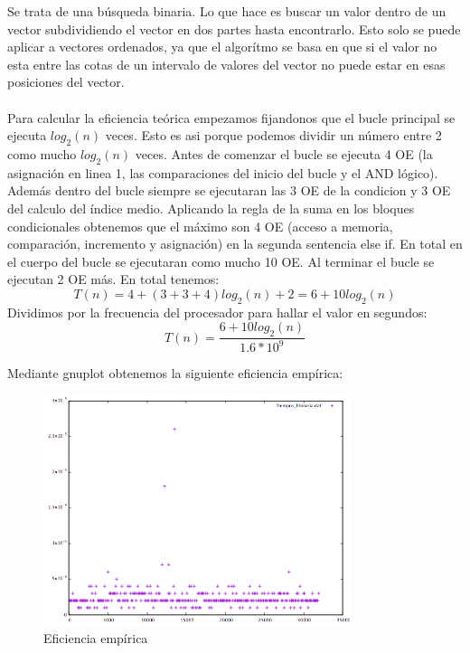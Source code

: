 \documentclass{article}
\begin{document}
	Se trata de una b\'usqueda binaria. Lo que hace es buscar un valor dentro de un vector subdividiendo el vector en dos partes hasta encontrarlo. Esto solo se puede aplicar a vectores ordenados, ya que el algor\'itmo se basa en que si el valor no esta entre las cotas de un intervalo de valores del vector no puede estar en esas posiciones del vector. \\ \\
	Para calcular la eficiencia te\'orica empezamos fijandonos que el bucle principal se ejecuta $log_2(n)$ veces. Esto es asi porque podemos dividir un n\'umero entre 2 como mucho  $log_2(n)$ veces. Antes de comenzar el bucle se ejecuta 4 OE (la asignaci\'on en linea 1, las comparaciones del inicio del bucle y el AND l\'ogico). Adem\'as dentro del bucle siempre se ejecutaran las 3 OE de la condicion y 3 OE del calculo del \'indice medio. Aplicando la regla de la suma en los bloques condicionales obtenemos que el m\'aximo son 4 OE (acceso a memoria, comparaci\'on, incremento y asignaci\'on) en la segunda sentencia else if. En total en el cuerpo del bucle se ejecutaran como mucho 10 OE. Al terminar el bucle se ejecutan 2 OE m\'as.
	En total tenemos: 
	\begin{equation}
		T(n) = 4 + (3+3+4)log_2(n) + 2 = 6+ 10log_2(n)
	\end{equation} 
	Dividimos por la frecuencia del procesador para hallar el valor en segundos:
	\begin{equation}
		T(n) = \frac{6+10log_2(n)}{1.6*10^9}
	\end{equation}
	
	Mediante gnuplot obtenemos la siguiente eficiencia emp\'irica:
	\begin{figure}[H]
  		\caption{Eficiencia emp\'irica}
  		\centering
  		\includegraphics[width=0.8\textwidth]{ejer3/grafica.png}
	\end{figure}
	
\end{document}
